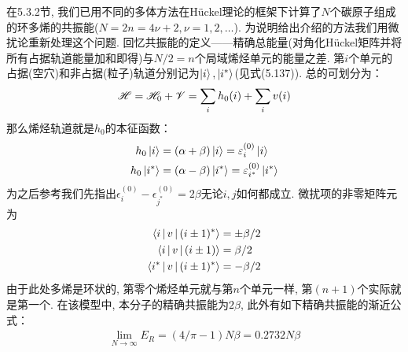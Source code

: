 在5.3.2节, 我们已用不同的多体方法在H\"uckel理论的框架下计算了$N$个碳原子组成的环多烯的共振能($N=2n=4\nu +2,\nu=1,2,\ldots$). 为说明给出介绍的方法我们用微扰论重新处理这个问题. 回忆共振能的定义——精确总能量(对角化H\"uckel矩阵并将所有占据轨道能量加和即得)与$N/2=n$个局域烯烃单元的能量之差. 第$i$个单元的占据(空穴)和非占据(粒子)轨道分别记为$\Ket{i},\Ket{i^*}$(见式(5.137)). 总的\ha 可划分为：
\begin{align}
\mathscr{H} = \mathscr{H}_0 + \mathscr{V} = \sum_ih_0(i) + \sum_iv(i)
\end{align}
那么烯烃轨道就是$h_0$的本征函数：
\begin{subequations}
	\begin{align}
	h_0\Ket{i} &= (\alpha+\beta)\Ket{i} = \varepsilon_i^{(0)}\Ket{i}\\
	h_0\Ket{i^*} &= (\alpha-\beta)\Ket{i^*} = \varepsilon_{i^*}^{(0)}\Ket{i^*}
	\end{align}
\end{subequations}
为之后参考我们先指出$\epsilon_i^{(0)} - \epsilon^{(0)}_{j^*}=2\beta$无论$i,j$如何都成立. 微扰项的非零矩阵元为
\begin{subequations}
	\begin{align}
	\Braket{i|v|(i\pm 1)^*} & = \pm\beta/2\\
	\Braket{i|v|(i\pm 1)} & = \beta/2\\
	\Braket{i^*|v|(i\pm 1)^*} & = -\beta/2\\
	\end{align}
\end{subequations}
由于此处多烯是环状的, 第零个烯烃单元就与第$n$个单元一样, 第$(n+1)$个实际就是第一个. 在该模型中, 本分子的精确共振能为$2\beta$, 此外有如下精确共振能的渐近公式：
\begin{align}
\lim\limits_{N\to\infty}E_R = (4/\pi-1)N\beta=0.2732N\beta
\end{align}

